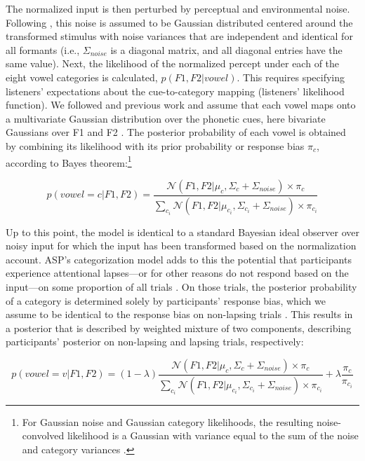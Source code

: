 \documentclass[preprint]{JASA}
\begin{document}
The normalized input is then perturbed by perceptual and environmental noise. Following \citet{feldman2009}, this noise is assumed to be Gaussian distributed centered around the transformed stimulus with noise variances that are independent and identical for all formants (i.e., \(\Sigma_{noise}\) is a diagonal matrix, and all diagonal entries have the same value). Next, the likelihood of the normalized percept under each of the eight vowel categories is calculated, \(p(F1, F2 | vowel)\). This requires specifying listeners' expectations about the cue-to-category mapping (listeners' likelihood function). We followed \citet{xie2023} and previous work and assume that each vowel maps onto a multivariate Gaussian distribution over the phonetic cues, here bivariate Gaussians over F1 and F2 \citep[cf.][]{clayards2008, feldman2009, kleinschmidt-jaeger2015, norris-mcqueen2008, xie2021}. The posterior probability of each vowel is obtained by combining its likelihood with its prior probability or response bias \(\pi_c\), according to Bayes theorem:\footnote{For Gaussian noise and Gaussian category likelihoods, the resulting noise-convolved likelihood is a Gaussian with variance equal to the sum of the noise and category variances \citep{kronrod2016}.}

\begin{equation}
 p(vowel = c |F1, F2) = \frac{\mathcal{N}(F1, F2| \mu_c, \Sigma_c + \Sigma_{noise}) \times \pi_c}{\sum_{c_i} \mathcal{N}(F1, F2|\mu_{c_i}, \Sigma_{c_i} + \Sigma_{noise}) \times \pi_{c_i}} \label{eq:Bayes-rule-normal}
\end{equation}

Up to this point, the model is identical to a standard Bayesian ideal observer over noisy input \citep{feldman2009, kronrod2016} for which the input has been transformed based on the normalization account. ASP's categorization model adds to this the potential that participants experience attentional lapses---or for other reasons do not respond based on the input---on some proportion of all trials \citep[\(\lambda\), as in standard psychometric lapsing models,][]{wichmann-hill2001}. On those trials, the posterior probability of a category is determined solely by participants' response bias, which we assume to be identical to the response bias on non-lapsing trials \citep[following][]{xie2023}. This results in a posterior that is described by weighted mixture of two components, describing participants' posterior on non-lapsing and lapsing trials, respectively:

\begin{equation}
 p(vowel = v|F1, F2) = (1-\lambda) \frac{\mathcal{N}(F1, F2| \mu_c, \Sigma_c + \Sigma_{noise}) \times \pi_c}{\sum_{c_i} \mathcal{N}(F1, F2|\mu_{c_i}, \Sigma_{c_i} + \Sigma_{noise}) \times \pi_{c_i}} + \lambda \frac{\pi_c}{\pi_{c_i}} \label{eq:Bayes-rule-ASP}
\end{equation}
\end{document}
